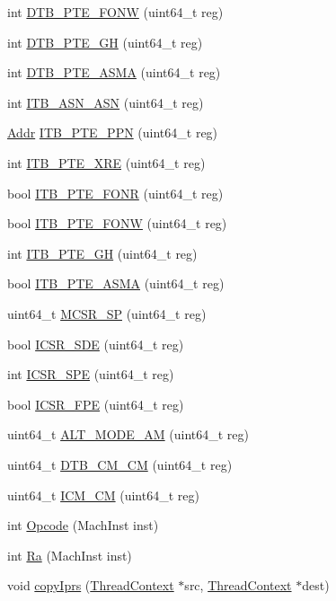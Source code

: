 \begin{DoxyCompactItemize}
\item 
int \hyperlink{namespaceAlphaISA_a32962f01b9ce7d53ebea64779cb769ba}{DTB\_\-PTE\_\-FONW} (uint64\_\-t reg)
\item 
int \hyperlink{namespaceAlphaISA_a4d5fad955e0b9ccad5b4e7d7820fa01c}{DTB\_\-PTE\_\-GH} (uint64\_\-t reg)
\item 
int \hyperlink{namespaceAlphaISA_a81680a8f0a79643e10fc7337821f5f37}{DTB\_\-PTE\_\-ASMA} (uint64\_\-t reg)
\item 
int \hyperlink{namespaceAlphaISA_aad79c10d320bef0ef127913e19eb2c5d}{ITB\_\-ASN\_\-ASN} (uint64\_\-t reg)
\item 
\hyperlink{base_2types_8hh_af1bb03d6a4ee096394a6749f0a169232}{Addr} \hyperlink{namespaceAlphaISA_a6c2a97078ce2e44d3f04ee016e712c48}{ITB\_\-PTE\_\-PPN} (uint64\_\-t reg)
\item 
int \hyperlink{namespaceAlphaISA_ad24b14426f25156fcab0dfea1992ebff}{ITB\_\-PTE\_\-XRE} (uint64\_\-t reg)
\item 
bool \hyperlink{namespaceAlphaISA_a6fd8f27f8a622d14744aaa0fc16ef7d2}{ITB\_\-PTE\_\-FONR} (uint64\_\-t reg)
\item 
bool \hyperlink{namespaceAlphaISA_aa80ea9dd70abdb33c458d4f99d4b3491}{ITB\_\-PTE\_\-FONW} (uint64\_\-t reg)
\item 
int \hyperlink{namespaceAlphaISA_a9640ea9e1d42b4e0f47250c7efe687f9}{ITB\_\-PTE\_\-GH} (uint64\_\-t reg)
\item 
bool \hyperlink{namespaceAlphaISA_a198dd6b2a31db4d72de90c9e4d02d9fc}{ITB\_\-PTE\_\-ASMA} (uint64\_\-t reg)
\item 
uint64\_\-t \hyperlink{namespaceAlphaISA_a1d43dec6cc4c104201ca82a0b2a28d56}{MCSR\_\-SP} (uint64\_\-t reg)
\item 
bool \hyperlink{namespaceAlphaISA_a77a0dc059f8e677358c55c3c206ea78b}{ICSR\_\-SDE} (uint64\_\-t reg)
\item 
int \hyperlink{namespaceAlphaISA_a1296f5f4491f6eafcd4cac6c96b2ceb4}{ICSR\_\-SPE} (uint64\_\-t reg)
\item 
bool \hyperlink{namespaceAlphaISA_ad98e58e7430195419d36c46d7bfb1af2}{ICSR\_\-FPE} (uint64\_\-t reg)
\item 
uint64\_\-t \hyperlink{namespaceAlphaISA_aea45c43f418ab3870323f1826f2a5038}{ALT\_\-MODE\_\-AM} (uint64\_\-t reg)
\item 
uint64\_\-t \hyperlink{namespaceAlphaISA_ad60009a95542d624d42cf5134774bda8}{DTB\_\-CM\_\-CM} (uint64\_\-t reg)
\item 
uint64\_\-t \hyperlink{namespaceAlphaISA_a95f34da1a383722d1e64b076a35cdcd9}{ICM\_\-CM} (uint64\_\-t reg)
\item 
int \hyperlink{namespaceAlphaISA_a9a4cdce6243495f64ef6cc1c6912da10}{Opcode} (MachInst inst)
\item 
int \hyperlink{namespaceAlphaISA_a5fb6bfaf48ec71f9e3354545d3aa85ff}{Ra} (MachInst inst)
\item 
void \hyperlink{namespaceAlphaISA_a42c226b069903e985920fe085c8d7a81}{copyIprs} (\hyperlink{classThreadContext}{ThreadContext} $\ast$src, \hyperlink{classThreadContext}{ThreadContext} $\ast$dest)
\end{DoxyCompactItemize}
